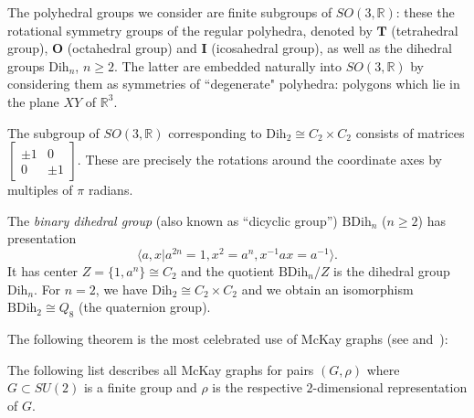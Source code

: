 \documentclass[ALCO]{cedram}
\begin{document}
{The polyhedral groups we consider are finite subgroups of $SO(3, \mathbb{R})$: these the rotational symmetry groups of the regular polyhedra, denoted by $\mathbf{T}$ (tetrahedral group), $\mathbf{O}$ (octahedral group) and $\mathbf{I}$ (icosahedral group), as well as the dihedral groups $\mathrm{Dih}_n$, $n\geq 2$. The latter are embedded naturally into $SO(3, \mathbb{R})$ by considering them as symmetries of ``degenerate" polyhedra: polygons which lie in the plane $XY$ of $\mathbb{R}^3$.

\begin{exam}\label{ex:Dih_2}
  The subgroup of $SO(3, \mathbb{R})$ corresponding to $\mathrm{Dih}_2 \cong C_2 \times C_2$ consists of matrices $ \begin{bmatrix}
  \pm 1 &0\\
  0 &\pm 1
  \end{bmatrix}$. These are precisely the rotations around the coordinate axes by multiples of $\pi$ radians.
\end{exam}}

\begin{exam}
The 
{\it binary dihedral group} (also known as ``dicyclic group'') $\mathrm{B}\mathrm{Dih}_{n}$ ($n\geq 2$) has presentation
$$\langle a, x | a^{2n} = 1, x^2=a^n, x^{-1}ax = a^{-1}\rangle.$$ It has center
$Z =\{1, a^n\}\cong C_2$ and the quotient $\mathrm{B}\mathrm{Dih}_{n}/Z$ is the dihedral group 
$\mathrm{Dih}_{n}$. For $n=2$, we have $\mathrm{Dih}_{2} \cong C_2 \times C_2$ and we obtain an 
isomorphism $\mathrm{B}\mathrm{Dih}_{2} \cong Q_8$ (the quaternion group).
\end{exam}

The following theorem is the most celebrated use of McKay graphs (see \cite[Proposition 4]{McKay} and~\cite{Steinberg}):
\begin{theorem}\label{thrm:mckay_class}
The following list describes all McKay graphs for pairs $(G, \rho)$ 
where $G\subset SU(2)$ is a finite group and $\rho$ is the respective
$2$-dimensional representation of $G$.

\end{theorem}
\end{document}
